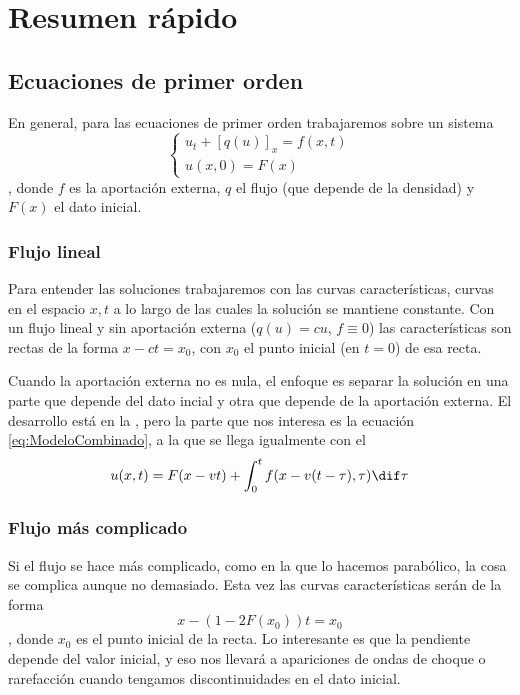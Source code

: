 \chapter{Resumen rápido}

\section{Ecuaciones de primer orden}

En general, para las ecuaciones de primer orden trabajaremos sobre un sistema \[ \begin{cases}
u_t + [q(u)]_x = f(x,t) \\
u(x,0) = F(x)
\end{cases}\], donde $f$ es la aportación externa, $q$ el flujo (que depende de la densidad) y $F(x)$ el dato inicial.

\subsection{Flujo lineal}

Para entender las soluciones trabajaremos con las curvas características, curvas en el espacio $x,t$ a lo largo de las cuales la solución se mantiene constante. Con un flujo lineal y sin aportación externa ($q(u) = cu$, $f \equiv 0$) las características son rectas de la forma $x - ct = x_0$, con $x_0$ el punto inicial (en $t = 0$) de esa recta.

Cuando la aportación externa no es nula, el enfoque es separar la solución en una parte que depende del dato incial y otra que depende de la aportación externa. El desarrollo está en la , pero la parte que nos interesa es la ecuación \eqref{eq:ModeloCombinado}, a la que se llega igualmente con el  \[ u(x,t) = F(x-vt)+ \int^{t}_{0} f(x-v(t-\tau),\tau) \dif \tau \]

\subsection{Flujo más complicado}

Si el flujo se hace más complicado, como en la  que lo hacemos parabólico, la cosa se complica aunque no demasiado. Esta vez las curvas características serán de la forma \[ x - (1 - 2F(x_0)) t = x_0 \], donde $x_0$ es el punto inicial de la recta. Lo interesante es que la pendiente depende del valor inicial, y eso nos llevará a apariciones de ondas de choque o rarefacción cuando tengamos discontinuidades en el dato inicial.


